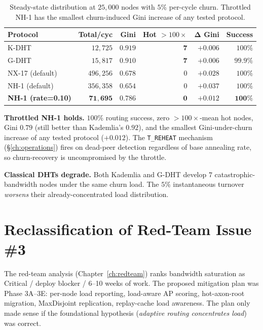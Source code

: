 \documentclass[twoside,nobib]{tufte-book}
\newcommand{\KDHT}{K-DHT\xspace}
\newcommand{\GDHT}{G-DHT\xspace}
\begin{document}
\begin{table}[t]
\centering
\small
\caption{Steady-state distribution at $25{,}000$ nodes with
$5\%$ per-cycle churn. Throttled NH-1 has the smallest
churn-induced Gini increase of any tested protocol.}
\label{tab:bw-churn}
\begin{tabular}{@{}lrrrrr@{}}
\toprule
\textbf{Protocol} & \textbf{Total/cyc} & \textbf{Gini} &
\textbf{Hot $>100\times$} & \textbf{Δ Gini} & \textbf{Success} \\
\midrule
\KDHT  & $12{,}725$ & $0.919$ & $\mathbf{7}$ & $+0.006$ & $100\%$ \\
\GDHT  & $15{,}817$ & $0.910$ & $\mathbf{7}$ & $+0.006$ & $99.9\%$ \\
NX-17 (default) & $496{,}256$ & $0.678$ & $0$ & $+0.028$ & $100\%$ \\
NH-1 (default) & $356{,}358$ & $0.654$ & $0$ & $+0.037$ & $100\%$ \\
\textbf{NH-1 (rate=0.10)} & $\mathbf{71{,}695}$ & $\mathbf{0.786}$ &
$\mathbf{0}$ & $\mathbf{+0.012}$ & $\mathbf{100\%}$ \\
\bottomrule
\end{tabular}
\end{table}

\textbf{Throttled NH-1 holds.} $100\%$ routing success,
zero $>100\times$-mean hot nodes, Gini $0.79$ (still better
than Kademlia's $0.92$), and the smallest Gini-under-churn
increase of any tested protocol ($+0.012$). The
\texttt{T\_REHEAT} mechanism (\S\ref{ch:operations}) fires on
dead-peer detection regardless of base annealing rate, so
churn-recovery is uncompromised by the throttle.

\textbf{Classical DHTs degrade.} Both Kademlia and \GDHT
develop $7$ catastrophic-bandwidth nodes under the same churn
load. The $5\%$ instantaneous turnover \emph{worsens} their
already-concentrated load distribution.

\section{Reclassification of Red-Team Issue \#3}

The red-team analysis (Chapter~\ref{ch:redteam}) ranks
bandwidth saturation as Critical / deploy blocker / 6--10
weeks of work. The proposed mitigation plan was Phase 3A--3E:
per-node load reporting, load-aware AP scoring, hot-axon-root
migration, MaxDisjoint replication, replay-cache load
awareness. The plan only made sense if the foundational
hypothesis (\emph{adaptive routing concentrates load}) was
correct.
\end{document}

